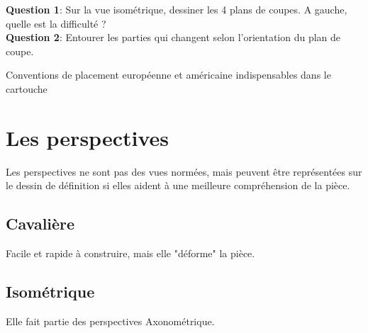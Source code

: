 \documentclass[
	11pt, %
	fleqn, %
	a4paper, %
]{LegrandOrangeBook}
\begin{document}
\begin{tcolorbox}[colback=gray!5!white,colframe=gray!75!ocre,title=Entrainement]

\textbf{Question 1}: Sur la vue isométrique, dessiner les 4 plans de coupes. A gauche, quelle est la difficulté ?\\

\textbf{Question 2}: Entourer les parties qui changent selon l'orientation du plan de coupe.

\end{tcolorbox}




Conventions de placement européenne et américaine indispensables dans le cartouche

\section{Les perspectives}
Les perspectives ne sont pas des vues normées, mais peuvent être représentées sur le dessin de définition si elles aident à une meilleure compréhension de la pièce.
\subsection{Cavalière}
Facile et rapide à construire, mais elle "déforme" la pièce.
\subsection{Isométrique}
Elle fait partie des perspectives Axonométrique.





\chapterspaceabove{6.25cm} %
\chapterspacebelow{7.5cm} %
\end{document}
